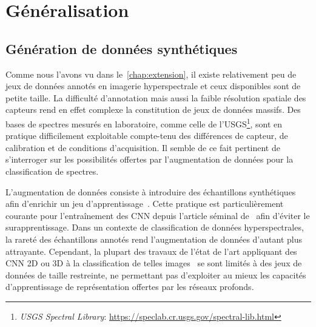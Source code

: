 \chapter{Généralisation}
\label{chap:generalisation}
\minitoc

\chapsummary{%

}

\newpage

\section{Génération de données synthétiques}

Comme nous l'avons vu dans le~\cref{chap:extension}, il existe relativement peu de jeux de données annotés en imagerie hyperspectrale et ceux disponibles sont de petite taille. La difficulté d'annotation mais aussi la faible résolution spatiale des capteurs rend en effet complexe la constitution de jeux de données massifs. Des bases de spectres mesurés en laboratoire, comme celle de l'\gls{USGS}\footnote{\emph{USGS Spectral Library}: \url{https://speclab.cr.usgs.gov/spectral-lib.html}}, sont en pratique difficilement exploitable compte-tenu des différences de capteur, de calibration et de conditions d'acquisition. Il semble de ce fait pertinent de s'interroger sur les possibilités offertes par l'augmentation de données pour la classification de spectres.

L'augmentation de données consiste à introduire des échantillons synthétiques afin d'enrichir un jeu d'apprentissage~\cite{dyk_art_2012}. Cette pratique est particulièrement courante pour l'entraînement des \gls{CNN} depuis l'article séminal de~\citet{krizhevsky_imagenet_2012} afin d'éviter le surapprentissage. Dans un contexte de classification de données hyperspectrales, la rareté des échantillons annotés rend l'augmentation de données d'autant plus attrayante. Cependant, la plupart des travaux de l'état de l'art appliquant des \gls{CNN} 2D ou 3D à la classification de telles images~\cite{chen_deep_2016,makantasis_deep_2015,slavkovikj_hyperspectral_2015,lee_contextual_2016} se sont limités à des jeux de données de taille restreinte, ne permettant pas d'exploiter au mieux les capacités d'apprentissage de représentation offertes par les réseaux profonds.

